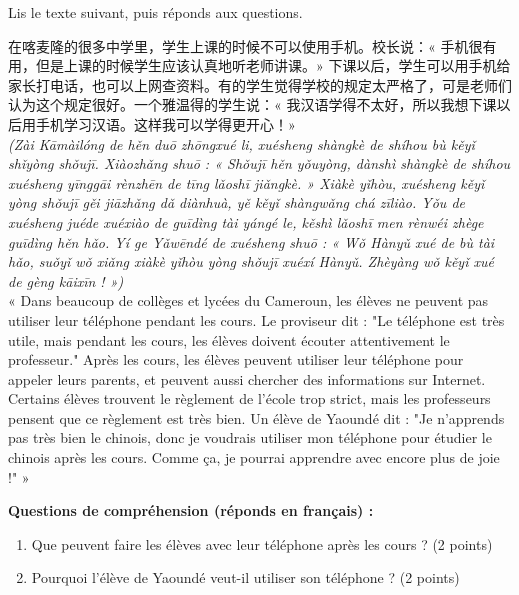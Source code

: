 \documentclass[11pt]{article}
\newcounter{popsec}
\newcounter{popsub}
\newcommand{\courssub}[1]{%
  \stepcounter{popsub}%
  \par\vspace{9pt}\noindent{\popxbold\fontsize{11.5}{13}\selectfont\color{popink}{\color{poporange}\thepopsec.\thepopsub}\hspace{6pt}#1}\par\nopagebreak\vspace{4pt}
}
\begin{document}
\courssub{Je me prépare au Bac}

\begin{exercice}
Lis le texte suivant, puis réponds aux questions.

\begin{textebox}
在喀麦隆的很多中学里，学生上课的时候不可以使用手机。校长说：« 手机很有用，但是上课的时候学生应该认真地听老师讲课。» 下课以后，学生可以用手机给家长打电话，也可以上网查资料。有的学生觉得学校的规定太严格了，可是老师们认为这个规定很好。一个雅温得的学生说：« 我汉语学得不太好，所以我想下课以后用手机学习汉语。这样我可以学得更开心！»\\
\emph{(Zài Kāmàilóng de hěn duō zhōngxué li, xuésheng shàngkè de shíhou bù kěyǐ shǐyòng shǒujī. Xiàozhǎng shuō : « Shǒujī hěn yǒuyòng, dànshì shàngkè de shíhou xuésheng yīnggāi rènzhēn de tīng lǎoshī jiǎngkè. » Xiàkè yǐhòu, xuésheng kěyǐ yòng shǒujī gěi jiāzhǎng dǎ diànhuà, yě kěyǐ shàngwǎng chá zīliào. Yǒu de xuésheng juéde xuéxiào de guīdìng tài yángé le, kěshì lǎoshī men rènwéi zhège guīdìng hěn hǎo. Yí ge Yǎwēndé de xuésheng shuō : « Wǒ Hànyǔ xué de bù tài hǎo, suǒyǐ wǒ xiǎng xiàkè yǐhòu yòng shǒujī xuéxí Hànyǔ. Zhèyàng wǒ kěyǐ xué de gèng kāixīn ! »)}\\
« Dans beaucoup de collèges et lycées du Cameroun, les élèves ne peuvent pas utiliser leur téléphone pendant les cours. Le proviseur dit : "Le téléphone est très utile, mais pendant les cours, les élèves doivent écouter attentivement le professeur." Après les cours, les élèves peuvent utiliser leur téléphone pour appeler leurs parents, et peuvent aussi chercher des informations sur Internet. Certains élèves trouvent le règlement de l'école trop strict, mais les professeurs pensent que ce règlement est très bien. Un élève de Yaoundé dit : "Je n'apprends pas très bien le chinois, donc je voudrais utiliser mon téléphone pour étudier le chinois après les cours. Comme ça, je pourrai apprendre avec encore plus de joie !" »
\end{textebox}

\textbf{Questions de compréhension (réponds en français) :}
\begin{enumerate}
\item Que peuvent faire les élèves avec leur téléphone après les cours ? (2 points)
\item Pourquoi l'élève de Yaoundé veut-il utiliser son téléphone ? (2 points)
\end{enumerate}


\end{exercice}
\end{document}
